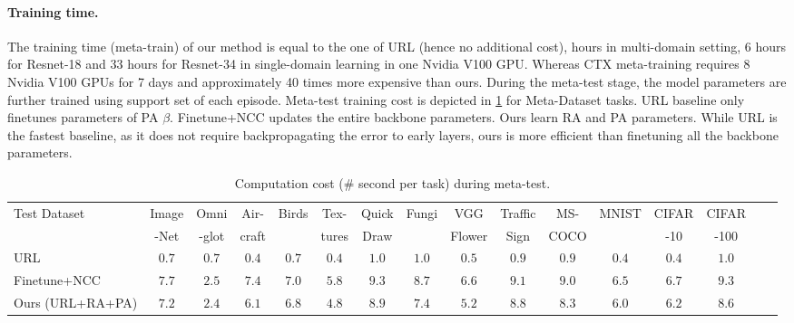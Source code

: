 \paragraph{Training time.}
The training time (meta-train) of our method is equal to the one of URL (hence no additional cost),  hours in multi-domain setting, 6 hours for Resnet-18 and 33 hours for Resnet-34 in single-domain learning in one Nvidia V100 GPU. 
Whereas CTX meta-training requires 8 Nvidia V100 GPUs for 7 days and approximately 40 times more expensive than ours. 
During the meta-test stage, the model parameters are further trained using support set of each episode. 
Meta-test training cost is depicted in \cref{supptab:testtime} for Meta-Dataset tasks. 
URL baseline only finetunes parameters of PA $\beta$.
Finetune+NCC updates the entire backbone parameters.
Ours learn RA and PA parameters. 
While URL is the fastest baseline, as it does not require backpropagating the error to early layers, ours is more efficient than finetuning all the backbone parameters.

\setcounter{table}{11}
\begin{table}[ht!]
	\centering
	
    \resizebox{1.0\textwidth}{!}
    {
		\begin{tabular}{lccccccccccccccc}

		    \toprule
		    \multirow{2}{*}{Test Dataset} & Image & Omni & Air- & \multirow{2}{*}{Birds} & Tex- & Quick & \multirow{2}{*}{Fungi} & VGG & Traffic & MS- & \multirow{2}{*}{MNIST} & CIFAR & CIFAR\\
		    & -Net & -glot & craft & & tures & Draw & & Flower & Sign & COCO & & -10 & -100 \\
		    \midrule
		    URL & $0.7$ & $0.7$ & $0.4$ & $0.7$ & $0.4$ & $1.0$ & $1.0$ & $0.5$ & $0.9$ & $0.9$ & $0.4$ & $0.4$ & $1.0$ \\
		    Finetune+NCC & $7.7$ & $2.5$ & $7.4$ & $7.0$ & $5.8$ & $9.3$ & $8.7$ & $6.6$ & $9.1$ & $9.0$ & $6.5$ & $6.7$ & $9.3$ \\
		    Ours (URL+RA+PA) & $7.2$ & $2.4$ & $6.1$ & $6.8$ & $4.8$ & $8.9$ & $7.4$ & $5.2$ & $8.8$ & $8.3$ & $6.0$ & $6.2$ & $8.6$ \\
			\bottomrule
		\end{tabular}%
			}
		\vspace{-0.35cm}
		\caption{\footnotesize Computation cost (\# second per task) during meta-test.}
		\label{supptab:testtime}
\end{table}%



